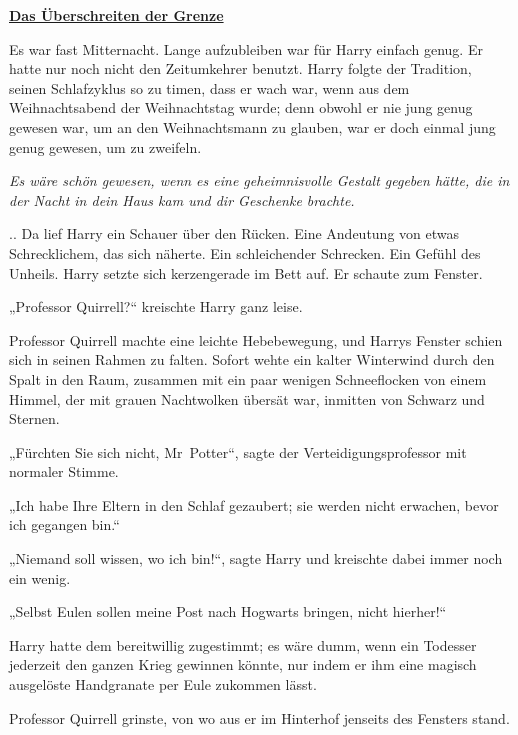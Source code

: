 

\hypertarget{das-uxfcberschreiten-der-grenze}{%

\textbf{\uline{Das Überschreiten der Grenze}}

Es war fast Mitternacht. Lange aufzubleiben war für Harry einfach genug. Er hatte nur noch nicht den Zeitumkehrer benutzt. Harry folgte der Tradition, seinen Schlafzyklus so zu timen, dass er wach war, wenn aus dem Weihnachtsabend der Weihnachtstag wurde; denn obwohl er nie jung genug gewesen war, um an den Weihnachtsmann zu glauben, war er doch einmal jung genug gewesen, um zu zweifeln.

\emph{Es wäre schön gewesen, wenn es eine geheimnisvolle Gestalt gegeben hätte, die in der Nacht in dein Haus kam und dir Geschenke brachte.}

.. Da lief Harry ein Schauer über den Rücken. Eine Andeutung von etwas Schrecklichem, das sich näherte. Ein schleichender Schrecken. Ein Gefühl des Unheils. Harry setzte sich kerzengerade im Bett auf. Er schaute zum Fenster.

„Professor Quirrell?“ kreischte Harry ganz leise.

Professor Quirrell machte eine leichte Hebebewegung, und Harrys Fenster schien sich in seinen Rahmen zu falten. Sofort wehte ein kalter Winterwind durch den Spalt in den Raum, zusammen mit ein paar wenigen Schneeflocken von einem Himmel, der mit grauen Nachtwolken übersät war, inmitten von Schwarz und Sternen.

„Fürchten Sie sich nicht, Mr~Potter“, sagte der Verteidigungsprofessor mit normaler Stimme.

„Ich habe Ihre Eltern in den Schlaf gezaubert; sie werden nicht erwachen, bevor ich gegangen bin.“

„Niemand soll wissen, wo ich bin!“, sagte Harry und kreischte dabei immer noch ein wenig.

„Selbst Eulen sollen meine Post nach Hogwarts bringen, nicht hierher!“

Harry hatte dem bereitwillig zugestimmt; es wäre dumm, wenn ein Todesser jederzeit den ganzen Krieg gewinnen könnte, nur indem er ihm eine magisch ausgelöste Handgranate per Eule zukommen lässt.

Professor Quirrell grinste, von wo aus er im Hinterhof jenseits des Fensters stand.

}
